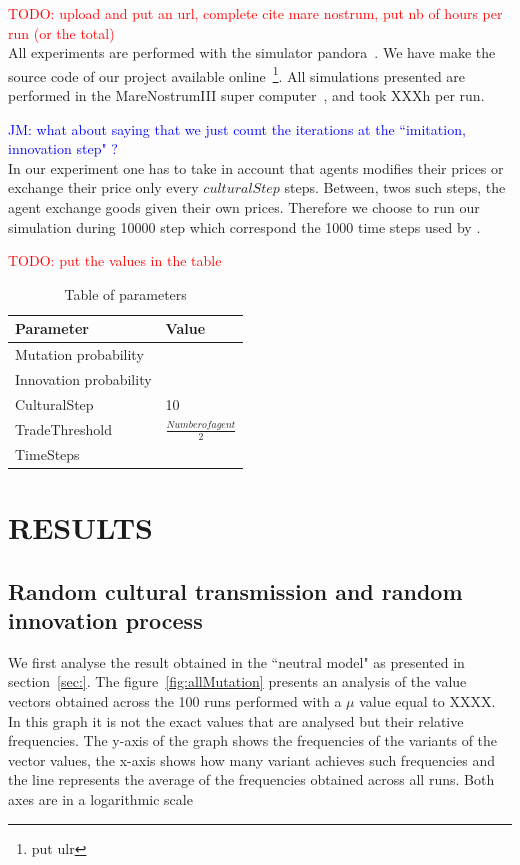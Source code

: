 \documentclass{wscpaperproc}
\newcommand{\memo}[2]{\textcolor{#1}{#2}}
\newcommand{\todo}[1]{\memo{red}{TODO: #1\\}}
\newcommand{\jm}[1]{\memo{blue}{JM: #1\\}}
\begin{document}
\todo{upload and put an url, complete cite mare nostrum, put nb of hours per run (or the total)}
All experiments are performed with the simulator pandora~\cite{wittek_scalable_2012}. We have make the source code of our project available online~\footnote{put ulr}. All simulations presented are performed in the MareNostrumIII super computer~\cite{}, and took XXXh per run.

\jm{what about saying that we just count the iterations at the ``imitation, innovation step" ?}
In our experiment one has to take in account that agents modifies their prices or exchange their price only every $culturalStep$ steps. Between, twos such steps, the agent exchange goods given their own prices. Therefore we choose to run our simulation during 10000 step which correspond the 1000 time steps used by \cite{bentley_random_2004,mesoudi_random_2009}.

\todo{put the values in the table}

\begin{table}
\begin{center}
\begin{tabular}{@{}ll@{}}
\toprule
Parameter & Value \\
\midrule
Mutation probability & \\
Innovation probability & \\
CulturalStep &  10 \\
TradeThreshold & $\frac{Number of agent}{2}$ \\
TimeSteps & \\
\bottomrule
\end{tabular}
\caption{Table of parameters}\label{tab:parameters}
\end{center}
\end{table}


\section{RESULTS}
\subsection{Random cultural transmission and random innovation process}

We first analyse the result obtained in the ``neutral model" as presented in section~\ref{sec:}. The figure~\ref{fig:allMutation} presents an analysis of the value vectors obtained across the 100 runs performed with a $\mu$ value equal to XXXX. In this graph it is not the exact values that are analysed but their relative frequencies. The y-axis of the graph shows the frequencies of the variants of the vector values, the x-axis shows how many variant achieves such frequencies and the line represents the average of the frequencies obtained across all runs. Both axes are in a logarithmic scale
\end{document}
